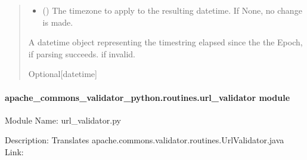 \documentclass[letterpaper,10pt,english]{sphinxmanual}
\begin{document}
\begin{fulllineitems}
\begin{fulllineitems}
\begin{quote}
\begin{description}
\begin{itemize}
\item {} 
\sphinxAtStartPar
{} (\sphinxstyleliteralemphasis{\sphinxupquote{{[}}}\sphinxstyleliteralemphasis{\sphinxupquote{{]}}}) \textendash{} The timezone to apply to the resulting datetime. If None, no change is made.

\end{itemize}

\sphinxAtStartPar
A datetime object representing the time\sphinxhyphen{}string elapsed since the the Epoch, if parsing succeeds.
 if invalid.

\sphinxAtStartPar
Optional{[}datetime{]}

\end{description}\end{quote}

\end{fulllineitems}


\end{fulllineitems}



\paragraph{apache\_commons\_validator\_python.routines.url\_validator module}
\label{\detokenize{apache_commons_validator_python.routines:module-apache_commons_validator_python.routines.url_validator}}\label{\detokenize{apache_commons_validator_python.routines:apache-commons-validator-python-routines-url-validator-module}}
\sphinxAtStartPar
Module Name: url\_validator.py

\sphinxAtStartPar
Description: Translates apache.commons.validator.routines.UrlValidator.java
Link: 
\end{document}
